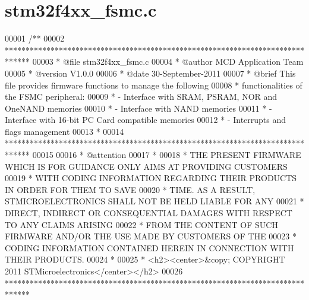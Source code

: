 \section{stm32f4xx\+\_\+fsmc.\+c}
\label{stm32f4xx__fsmc_8c_source}

\begin{DoxyCode}
00001 \textcolor{comment}{/**}
00002 \textcolor{comment}{  ******************************************************************************}
00003 \textcolor{comment}{  * @file    stm32f4xx\_fsmc.c}
00004 \textcolor{comment}{  * @author  MCD Application Team}
00005 \textcolor{comment}{  * @version V1.0.0}
00006 \textcolor{comment}{  * @date    30-September-2011}
00007 \textcolor{comment}{ * @brief    This file provides firmware functions to manage the following }
00008 \textcolor{comment}{  *          functionalities of the FSMC peripheral:           }
00009 \textcolor{comment}{  *           - Interface with SRAM, PSRAM, NOR and OneNAND memories}
00010 \textcolor{comment}{  *           - Interface with NAND memories}
00011 \textcolor{comment}{  *           - Interface with 16-bit PC Card compatible memories  }
00012 \textcolor{comment}{  *           - Interrupts and flags management   }
00013 \textcolor{comment}{  *           }
00014 \textcolor{comment}{  ******************************************************************************}
00015 \textcolor{comment}{}
00016 \textcolor{comment}{  * @attention}
00017 \textcolor{comment}{  *}
00018 \textcolor{comment}{  * THE PRESENT FIRMWARE WHICH IS FOR GUIDANCE ONLY AIMS AT PROVIDING CUSTOMERS}
00019 \textcolor{comment}{  * WITH CODING INFORMATION REGARDING THEIR PRODUCTS IN ORDER FOR THEM TO SAVE}
00020 \textcolor{comment}{  * TIME. AS A RESULT, STMICROELECTRONICS SHALL NOT BE HELD LIABLE FOR ANY}
00021 \textcolor{comment}{  * DIRECT, INDIRECT OR CONSEQUENTIAL DAMAGES WITH RESPECT TO ANY CLAIMS ARISING}
00022 \textcolor{comment}{  * FROM THE CONTENT OF SUCH FIRMWARE AND/OR THE USE MADE BY CUSTOMERS OF THE}
00023 \textcolor{comment}{  * CODING INFORMATION CONTAINED HEREIN IN CONNECTION WITH THEIR PRODUCTS.}
00024 \textcolor{comment}{  *}
00025 \textcolor{comment}{  * <h2><center>&copy; COPYRIGHT 2011 STMicroelectronics</center></h2>}
00026 \textcolor{comment}{  ******************************************************************************}

\end{DoxyCode}
